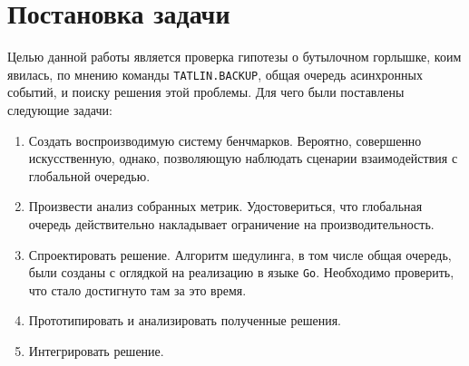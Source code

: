 
\section{Постановка задачи}
\label{sec:task}

Целью данной работы является проверка гипотезы о бутылочном горлышке, коим явилась, по мнению команды \verb|TATLIN.BACKUP|, общая очередь асинхронных событий, и поиску решения этой проблемы. Для чего были поставлены следующие задачи:

\begin{enumerate}
    \item Создать воспроизводимую систему бенчмарков. Вероятно, совершенно искусственную, однако, позволяющую наблюдать сценарии взаимодействия с глобальной очередью.
    \item Произвести анализ собранных метрик. Удостовериться, что глобальная очередь действительно накладывает ограничение на производительность.
    \item Спроектировать решение. Алгоритм шедулинга, в том числе общая очередь, были созданы с оглядкой на реализацию в языке \verb|Go|. Необходимо проверить, что стало достигнуто там за это время.
    \item Прототипировать и анализировать полученные решения.
    \item Интегрировать решение.
\end{enumerate}
